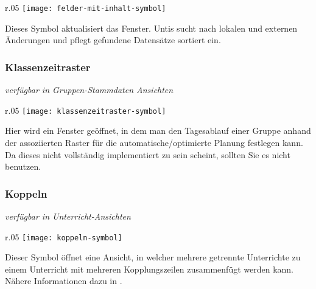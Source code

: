 \begin{wrapfigure}{r}{.05\textwidth}
	\vspace{-50pt}
	\texttt{[image: felder-mit-inhalt-symbol]}
	\vspace{-35pt}
\end{wrapfigure}

\noindent
Dieses Symbol aktualisiert das Fenster. Untis sucht nach lokalen und externen Änderungen und pflegt gefundene Datensätze sortiert ein.\\

\newpage

\subsubsection{Klassenzeitraster}
{\small\textit{verfügbar in Gruppen-Stammdaten Ansichten\\}\par}

\begin{wrapfigure}{r}{.05\textwidth}
	\vspace{-50pt}
	\texttt{[image: klassenzeitraster-symbol]}
	\vspace{-35pt}
\end{wrapfigure}

\noindent
Hier wird ein Fenster geöffnet, in dem man den Tagesablauf einer Gruppe anhand der assoziierten Raster für die automatische/optimierte Planung festlegen kann. Da dieses nicht vollständig implementiert zu sein scheint, sollten Sie es nicht benutzen.\\

\subsubsection{Koppeln}
{\small\textit{verfügbar in Unterricht-Ansichten\\}\par}

\begin{wrapfigure}{r}{.05\textwidth}
	\vspace{-50pt}
	\texttt{[image: koppeln-symbol]}
	\vspace{-35pt}
\end{wrapfigure}

\noindent
Dieser Symbol öffnet eine Ansicht, in welcher mehrere getrennte Unterrichte zu einem Unterricht mit mehreren Kopplungszeilen zusammenfügt werden kann. Nähere Informationen dazu in .\\


